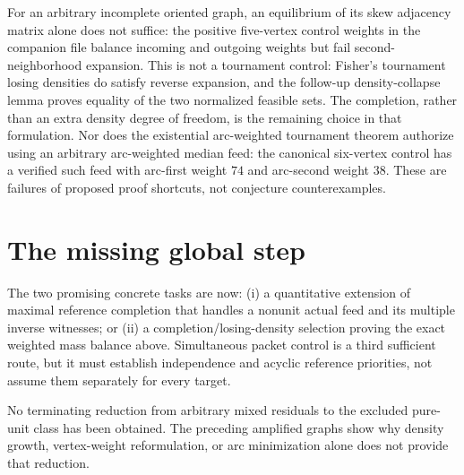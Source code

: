 For an arbitrary incomplete oriented graph, an equilibrium of its skew
adjacency matrix alone does not suffice: the positive five-vertex control
weights in the companion file balance incoming and outgoing weights but
fail second-neighborhood expansion. This is not a tournament control:
Fisher's tournament losing densities do satisfy reverse expansion, and
the follow-up density-collapse lemma proves equality of the two normalized
feasible sets. The completion, rather than an extra density degree of
freedom, is the remaining choice in that formulation.
Nor does the existential arc-weighted tournament theorem authorize using
an arbitrary arc-weighted median feed: the canonical six-vertex control
has a verified such feed with arc-first weight $74$ and arc-second weight
$38$. These are failures of proposed proof shortcuts, not conjecture
counterexamples.

\section{The missing global step}
\label{sec:global-open-step}

The two promising concrete tasks are now:
(i) a quantitative extension of maximal reference completion that handles
a nonunit actual feed and its multiple inverse witnesses; or
(ii) a completion/losing-density selection proving the exact weighted
mass balance above. Simultaneous packet control is a third sufficient
route, but it must establish independence and acyclic reference priorities,
not assume them separately for every target.

No terminating reduction from arbitrary mixed residuals to the excluded
pure-unit class has been obtained. The preceding amplified graphs show
why density growth, vertex-weight reformulation, or arc minimization alone
does not provide that reduction.
